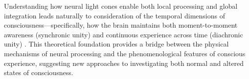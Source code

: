Understanding how neural light cones enable both local processing and global integration leads naturally to consideration of the temporal dimensions of consciousness—specifically, how the brain maintains both moment-to-moment awareness (synchronic unity) and continuous experience across time (diachronic unity) \cite{hoel2017when}. This theoretical foundation provides a bridge between the physical mechanisms of neural processing and the phenomenological features of conscious experience, suggesting new approaches to investigating both normal and altered states of consciousness.